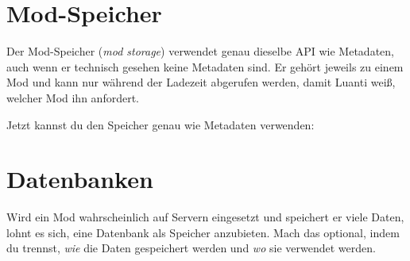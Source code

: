 \section{Mod-Speicher}\label{mod-speicher}

Der Mod-Speicher (\emph{mod storage})
verwendet genau dieselbe API wie Metadaten, auch wenn er technisch
gesehen keine Metadaten sind. Er gehört jeweils zu einem Mod und kann
nur während der Ladezeit abgerufen werden, damit Luanti weiß, welcher
Mod ihn anfordert.

\begin{Shaded}
\begin{Highlighting}[]
  \OperatorTok{=} \OperatorTok{()}
\end{Highlighting}
\end{Shaded}

Jetzt kannst du den Speicher genau wie Metadaten verwenden:

\begin{Shaded}
\begin{Highlighting}[]
\OperatorTok{:}\OperatorTok{(}\OperatorTok{,} \OperatorTok{)}
\end{Highlighting}
\end{Shaded}

\section{Datenbanken}\label{datenbanken}

Wird ein Mod wahrscheinlich auf Servern eingesetzt und speichert er
viele Daten, lohnt es sich, eine Datenbank als Speicher anzubieten. Mach
das optional, indem du trennst, \emph{wie} die Daten gespeichert werden
und \emph{wo} sie verwendet werden.

\begin{Shaded}
\begin{Highlighting}[]
 
  
     \OperatorTok{=} \OperatorTok{(}
        \OperatorTok{(}\OperatorTok{)}  
    \OperatorTok{)}
     \OperatorTok{=} \OperatorTok{(}
        \OperatorTok{(}\OperatorTok{)}  
    \OperatorTok{)}

\OperatorTok{(}\OperatorTok{)}
\OperatorTok{(}\OperatorTok{,} \OperatorTok{\{}  \OperatorTok{=}  \OperatorTok{\})}
\end{Highlighting}
\end{Shaded}


